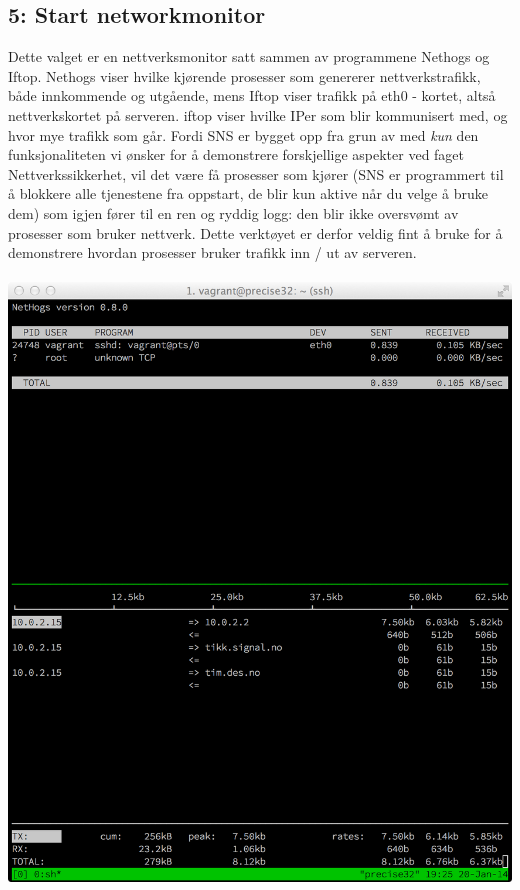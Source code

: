 \documentclass{article}
\begin{document}
\subsection{5: Start networkmonitor}
Dette valget er en nettverksmonitor satt sammen av programmene Nethogs og Iftop. Nethogs viser hvilke kjørende prosesser som genererer nettverkstrafikk, både innkommende og utgående, mens Iftop viser trafikk på eth0 - kortet, altså nettverkskortet på serveren. iftop viser hvilke IPer som blir kommunisert med, og hvor mye trafikk som går. Fordi SNS er bygget opp fra grun av med \textit{kun} den funksjonaliteten vi ønsker for å demonstrere forskjellige aspekter ved faget Nettverkssikkerhet, vil det være få prosesser som kjører (SNS er programmert til å blokkere alle tjenestene fra oppstart, de blir kun aktive når du velge å bruke dem) som igjen fører til en ren og ryddig logg: den blir ikke oversvømt av prosesser som bruker nettverk. Dette verktøyet er derfor veldig fint å bruke for å demonstrere hvordan prosesser bruker trafikk inn / ut av serveren. 
\\ \\
\includegraphics[scale = 0.6]{pictures/networkmonitor.png} 
\end{document}
